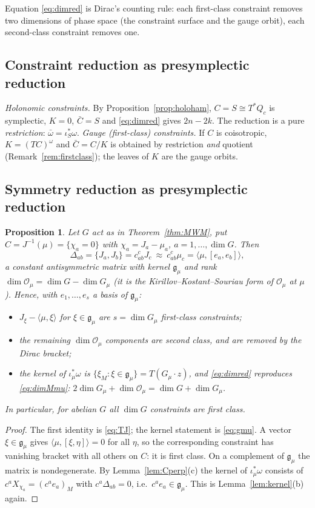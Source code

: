 \documentclass[11pt,a4paper]{article}
\numberwithin{equation}{section}
\theoremstyle{plain}
\newtheorem{proposition}[theorem]{Proposition}
\theoremstyle{definition}
\theoremstyle{remark}
\newcommand{\frakg}{\mathfrak{g}}
\newcommand{\pb}[2]{\{#1,#2\}}
\newcommand{\pair}[2]{\langle #1,#2\rangle}
\newcommand{\weq}{\mathrel{\approx}}
\begin{document}
Equation \eqref{eq:dimred} is Dirac's counting rule: each first-class constraint removes two dimensions of phase space (the constraint surface and the gauge orbit), each second-class constraint removes one.

\subsection{Constraint reduction as presymplectic reduction}

\emph{Holonomic constraints.} By Proposition~\ref{prop:holoham}, $C=S\cong T^*Q_c$ is symplectic, $K=0$, $\bar C=S$ and \eqref{eq:dimred} gives $2n-2k$. The reduction is a pure \emph{restriction}: $\bar\omega=\iota_S^*\omega$.
\emph{Gauge (first-class) constraints.} If $C$ is coisotropic, $K=(TC)^\omega$ and $\bar C=C/K$ is obtained by restriction \emph{and} quotient (Remark~\ref{rem:firstclass}); the leaves of $K$ are the gauge orbits.

\subsection{Symmetry reduction as presymplectic reduction}

\begin{proposition}\label{prop:symclass}
Let $G$ act as in Theorem~\ref{thm:MWM}, put $C=J^{-1}(\mu)=\{\chi_a=0\}$ with $\chi_a=J_a-\mu_a$, $a=1,\dots,\dim G$. Then
\begin{equation}\label{eq:DeltaJ}
\Delta_{ab}=\pb{J_a}{J_b}=c^c_{ab}J_c\ \weq\ c^c_{ab}\mu_c=\pair\mu{[e_a,e_b]},
\end{equation}
a constant antisymmetric matrix with kernel $\frakg_\mu$ and rank $\dim\mathcal O_\mu=\dim G-\dim G_\mu$ (it is the Kirillov--Kostant--Souriau form of $\mathcal O_\mu$ at $\mu$). Hence, with $e_1,\dots,e_s$ a basis of $\frakg_\mu$:
\begin{itemize}
\item $J_\xi-\pair\mu\xi$ for $\xi\in\frakg_\mu$ are $s=\dim G_\mu$ \emph{first-class} constraints;
\item the remaining $\dim\mathcal O_\mu$ components are \emph{second class}, and are removed by the Dirac bracket;
\item the kernel of $\iota_\mu^*\omega$ is $\{\xi_M:\xi\in\frakg_\mu\}=T(G_\mu\cdot z)$, and \eqref{eq:dimred} reproduces \eqref{eq:dimMmu}: $2\dim G_\mu+\dim\mathcal O_\mu=\dim G+\dim G_\mu$.
\end{itemize}
In particular, for abelian $G$ all $\dim G$ constraints are first class.
\end{proposition}
\begin{proof}
The first identity is \eqref{eq:TJ}; the kernel statement is \eqref{eq:gmu}. A vector $\xi\in\frakg_\mu$ gives $\pair\mu{[\xi,\eta]}=0$ for all $\eta$, so the corresponding constraint has vanishing bracket with all others on $C$: it is first class. On a complement of $\frakg_\mu$ the matrix is nondegenerate. By Lemma~\ref{lem:Cperp}(c) the kernel of $\iota_\mu^*\omega$ consists of $c^aX_{\chi_a}=(c^ae_a)_M$ with $c^a\Delta_{ab}=0$, i.e.\ $c^ae_a\in\frakg_\mu$. This is Lemma~\ref{lem:kernel}(b) again.
\end{proof}
\end{document}
